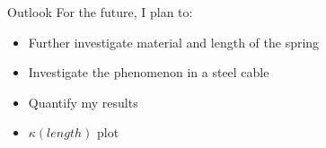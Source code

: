 \documentclass{beamer}
\begin{document}
	\begin{frame}{Outlook}
	For the future, I plan to:
	\begin{itemize}
	\item
	Further investigate material and length of the spring
	\item
	Investigate the phenomenon in a steel cable
	\item
	Quantify my results
	\item
	$\kappa(length)$ plot
	\end{itemize}
	
	\end{frame}	
\end{document}
